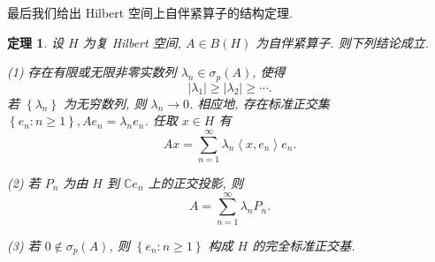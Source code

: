 \documentclass[openany]{ctexbook}
\theoremstyle{kaiti}
\newtheorem{theorem}{定理}[section]
\theoremstyle{normal}
\begin{document}
最后我们给出 Hilbert 空间上自伴紧算子的结构定理.

\begin{theorem}
设 $H$ 为复 Hilbert 空间, $A \in B(H)$ 为自伴紧算子. 则下列结论成立.

(1) 存在有限或无限非零实数列 $\lambda_n \in \sigma_{p}(A)$, 使得
$$
\left|\lambda_1\right| \geqslant\left|\lambda_2\right| \geqslant \cdots.
$$
若 $\left\{\lambda_n\right\}$ 为无穷数列, 则 $\lambda_n \rightarrow 0$. 相应地, 存在标准正交集 $\left\{e_n: n \geqslant 1\right\}, A e_n=\lambda_n e_n$. 任取 $x \in H$ 有
$$
A x=\sum_{n=1}^{\infty} \lambda_n\left\langle x, e_n\right\rangle e_n.
$$

(2) 若 $P_n$ 为由 $H$ 到 $\mathbb{C} e_n$ 上的正交投影, 则
$$
A=\sum_{n=1}^{\infty} \lambda_n P_n.
$$

(3) 若 $0 \notin \sigma_{p}(A)$, 则 $\left\{e_n: n \geqslant 1\right\}$ 构成 $H$ 的完全标准正交基.
\end{theorem}
\end{document}
